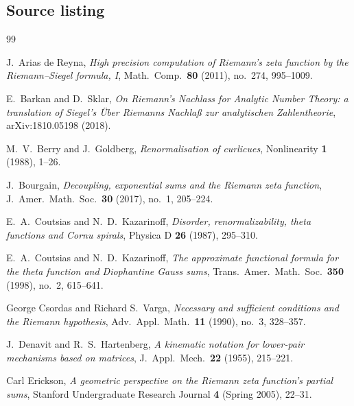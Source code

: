 \documentclass[11pt]{article}
\theoremstyle{definition}
\begin{document}
\subsection{Source listing}




\begin{thebibliography}{99}

J.~Arias de Reyna, \emph{High precision computation of Riemann's zeta function
by the Riemann--Siegel formula, I}, Math.\ Comp.\ \textbf{80} (2011),
no.~274, 995--1009.

E.~Barkan and D.~Sklar, \emph{On Riemann's Nachlass for Analytic Number
Theory: a translation of Siegel's \"Uber Riemanns Nachla\ss{} zur
analytischen Zahlentheorie}, arXiv:1810.05198 (2018).

M.~V.\ Berry and J.~Goldberg, \emph{Renormalisation of curlicues},
Nonlinearity \textbf{1} (1988), 1--26.

J.~Bourgain, \emph{Decoupling, exponential sums and the Riemann zeta function},
J.\ Amer.\ Math.\ Soc.\ \textbf{30} (2017), no.~1, 205--224.

E.~A.\ Coutsias and N.~D.\ Kazarinoff, \emph{Disorder, renormalizability, theta
functions and Cornu spirals}, Physica D \textbf{26} (1987), 295--310.

E.~A.\ Coutsias and N.~D.\ Kazarinoff, \emph{The approximate functional formula
for the theta function and Diophantine Gauss sums}, Trans.\ Amer.\ Math.\ Soc.\
\textbf{350} (1998), no.~2, 615--641.

George Csordas and Richard S.\ Varga, \emph{Necessary and sufficient conditions
and the Riemann hypothesis}, Adv.\ Appl.\ Math.\ \textbf{11} (1990), no.~3,
328--357.

J.~Denavit and R.~S.\ Hartenberg, \emph{A kinematic notation for lower-pair
mechanisms based on matrices}, J.\ Appl.\ Mech.\ \textbf{22} (1955), 215--221.

Carl Erickson, \emph{A geometric perspective on the Riemann zeta function's
partial sums}, Stanford Undergraduate Research Journal \textbf{4} (Spring
2005), 22--31.


\end{thebibliography}
\end{document}
